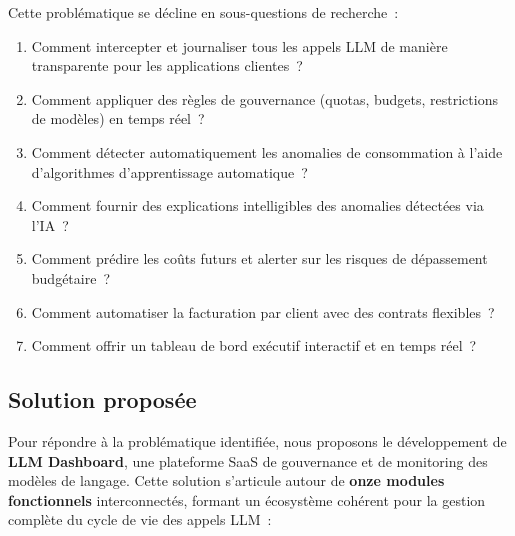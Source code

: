 Cette problématique se décline en sous-questions de recherche~:

\begin{enumerate}[noitemsep]
    \item Comment intercepter et journaliser tous les appels LLM de manière transparente pour les applications clientes~?
    \item Comment appliquer des règles de gouvernance (quotas, budgets, restrictions de modèles) en temps réel~?
    \item Comment détecter automatiquement les anomalies de consommation à l'aide d'algorithmes d'apprentissage automatique~?
    \item Comment fournir des explications intelligibles des anomalies détectées via l'IA~?
    \item Comment prédire les coûts futurs et alerter sur les risques de dépassement budgétaire~?
    \item Comment automatiser la facturation par client avec des contrats flexibles~?
    \item Comment offrir un tableau de bord exécutif interactif et en temps réel~?
\end{enumerate}


\subsection{Solution proposée}

Pour répondre à la problématique identifiée, nous proposons le développement de \textbf{LLM Dashboard}, une plateforme SaaS de gouvernance et de monitoring des modèles de langage. Cette solution s'articule autour de \textbf{onze modules fonctionnels} interconnectés, formant un écosystème cohérent pour la gestion complète du cycle de vie des appels LLM~:


